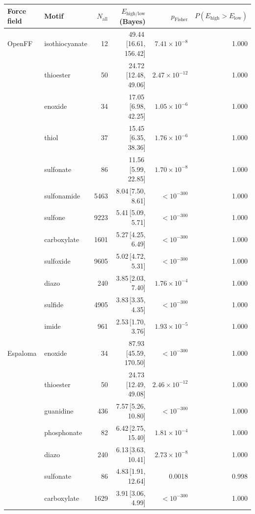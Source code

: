 \begin{table}[t]
  \centering
  \small
  \setlength{\tabcolsep}{6pt}
  \renewcommand{\arraystretch}{1.15}
  \begin{tabular}{llrrrr}
    \hline
    Force field & Motif & $N_\mathrm{all}$ & $E_{\mathrm{high/low}}$ (Bayes) & $p_\mathrm{Fisher}$ & $P(E_{\mathrm{high}}>E_{\mathrm{low}})$ \\
    \hline
    OpenFF & isothiocyanate & 12 & 49.44\,[16.61, 156.42] & $7.41\times 10^{-8}$ & 1.000 \\
      & thioester & 50 & 24.72\,[12.48, 49.06] & $2.47\times 10^{-12}$ & 1.000 \\
      & enoxide & 34 & 17.05\,[6.98, 42.25] & $1.05\times 10^{-6}$ & 1.000 \\
      & thiol & 37 & 15.45\,[6.35, 38.36] & $1.76\times 10^{-6}$ & 1.000 \\
      & sulfonate & 86 & 11.56\,[5.99, 22.85] & $1.70\times 10^{-8}$ & 1.000 \\
      & sulfonamide & 5463 & 8.04\,[7.50, 8.61] & $< 10^{-300}$ & 1.000 \\
      & sulfone & 9223 & 5.41\,[5.09, 5.71] & $< 10^{-300}$ & 1.000 \\
      & carboxylate & 1601 & 5.27\,[4.25, 6.49] & $< 10^{-300}$ & 1.000 \\
      & sulfoxide & 9605 & 5.02\,[4.72, 5.31] & $< 10^{-300}$ & 1.000 \\
      & diazo & 240 & 3.85\,[2.03, 7.40] & $1.76\times 10^{-4}$ & 1.000 \\
      & sulfide & 4905 & 3.83\,[3.35, 4.35] & $< 10^{-300}$ & 1.000 \\
      & imide & 961 & 2.53\,[1.70, 3.76] & $1.93\times 10^{-5}$ & 1.000 \\
    \hline
    Espaloma & enoxide & 34 & 87.93\,[45.59, 170.50] & $< 10^{-300}$ & 1.000 \\
      & thioester & 50 & 24.73\,[12.49, 49.08] & $2.46\times 10^{-12}$ & 1.000 \\
      & guanidine & 436 & 7.57\,[5.26, 10.80] & $< 10^{-300}$ & 1.000 \\
      & phosphonate & 82 & 6.42\,[2.75, 15.40] & $1.81\times 10^{-4}$ & 1.000 \\
      & diazo & 240 & 6.13\,[3.63, 10.41] & $2.73\times 10^{-8}$ & 1.000 \\
      & sulfonate & 86 & 4.83\,[1.91, 12.64] & 0.0018 & 0.998 \\
      & carboxylate & 1629 & 3.91\,[3.06, 4.99] & $< 10^{-300}$ & 1.000 \\

\end{tabular}
\end{table}
